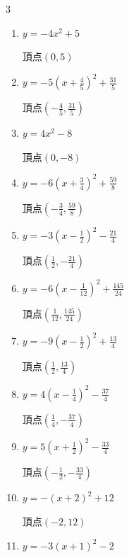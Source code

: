 \begin{multicols}{3}
\begin{enumerate}
\columnbreak %

  \item $\displaystyle y=-4x^{2}+5$

        $\displaystyle 頂点\left( 0 , 5 \right)$

  \item $\displaystyle y=-5\left( x+\frac{4}{5}\right)^{2}+\frac{31}{5}$

        $\displaystyle 頂点\left( -\frac{4}{5} , \frac{31}{5} \right)$

  \item $\displaystyle y=4x^{2}-8$

        $\displaystyle 頂点\left( 0 , -8 \right)$

  \item $\displaystyle y=-6\left( x+\frac{3}{4}\right)^{2}+\frac{59}{8}$

        $\displaystyle 頂点\left( -\frac{3}{4} , \frac{59}{8} \right)$

  \item $\displaystyle y=-3\left( x-\frac{1}{2}\right)^{2}-\frac{21}{4}$

        $\displaystyle 頂点\left( \frac{1}{2} , -\frac{21}{4} \right)$

  \item $\displaystyle y=-6\left( x-\frac{1}{12}\right)^{2}+\frac{145}{24}$

        $\displaystyle 頂点\left( \frac{1}{12} , \frac{145}{24} \right)$

  \item $\displaystyle y=-9\left( x-\frac{1}{2}\right)^{2}+\frac{13}{4}$

        $\displaystyle 頂点\left( \frac{1}{2} , \frac{13}{4} \right)$

  \item $\displaystyle y=4\left( x-\frac{1}{4}\right)^{2}-\frac{37}{4}$

        $\displaystyle 頂点\left( \frac{1}{4} , -\frac{37}{4} \right)$

  \item $\displaystyle y=5\left( x+\frac{1}{2}\right)^{2}-\frac{33}{4}$

        $\displaystyle 頂点\left( -\frac{1}{2} , -\frac{33}{4} \right)$

  \item $\displaystyle y=-\left( x+2\right)^{2}+12$

        $\displaystyle 頂点\left( -2 , 12 \right)$

  \item $\displaystyle y=-3\left( x+1\right)^{2}-2$


\end{enumerate}
\end{multicols}
